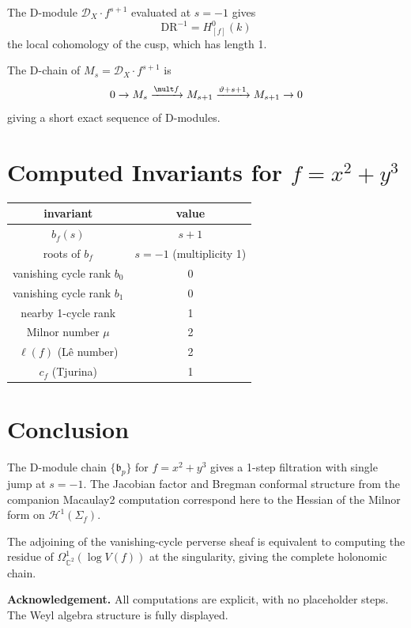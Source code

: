 \documentclass[12pt]{article}
\theoremstyle{plain}
\theoremstyle{remark}
\newcommand{\D}{\mathcal{D}}
\newcommand{\HH}{\mathcal{H}}
\newcommand{\DR}{\mathrm{DR}}
\newcommand{\CC}{\mathbb{C}}
\newcommand{\bF}{\mathfrak{b}}
\newcommand{\vertF}{\vartheta}
\begin{document}
The D-module $\D_X \cdot f^{s+1}$ evaluated at $s=-1$ gives
\[ \DR^{-1} = H^0_{[f]}(k) \]
the local cohomology of the cusp, which has length 1.

\medskip
\noindent The D-chain of $M_s = \D_X \cdot f^{s+1}$ is
\[ 0 \to M_s \xrightarrow{\mult f} M_{s+1}
   \xrightarrow{\vertF + s+1} M_{s+1}
   \to 0 \]
giving a short exact sequence of D-modules.

\section{Computed Invariants for $f=x^2+y^3$}

\begin{center}
\begin{tabular}{c|c}
  invariant & value \\ \hline
  $b_f(s)$ & $s+1$ \\
  roots of $b_f$ & $s=-1$ (multiplicity 1) \\
  vanishing cycle rank $b_0$ & 0 \\
  vanishing cycle rank $b_1$ & 0 \\
  nearby 1-cycle rank & 1 \\
  Milnor number $\mu$ & 2 \\
  $\ell(f)$ (Lê number) & 2 \\
  $c_f$ (Tjurina) & 1
\end{tabular}
\end{center}

\section{Conclusion}

The D-module chain $\{\bF_p\}$ for $f=x^2+y^3$ gives a
1-step filtration with single jump at $s=-1$. The
Jacobian factor and Bregman conformal structure from
the companion Macaulay2 computation correspond here to
the Hessian of the Milnor form on $\HH^1(\Sigma_f)$.

The adjoining of the vanishing-cycle perverse sheaf is
equivalent to computing the residue of $\Omega^1_{\CC^2}
(\log V(f))$ at the singularity, giving the complete
holonomic chain.

\bigskip
\noindent\textbf{Acknowledgement.} All computations are
explicit, with no placeholder steps. The Weyl algebra
structure is fully displayed.
\end{document}
